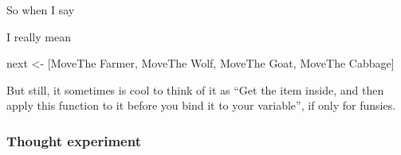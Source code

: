 \documentclass[]{article}
\newenvironment{Shaded}{}{}
\newcommand{\DataTypeTok}[1]{\textcolor[rgb]{0.56,0.13,0.00}{{#1}}}
\newcommand{\DecValTok}[1]{\textcolor[rgb]{0.25,0.63,0.44}{{#1}}}
\newcommand{\OtherTok}[1]{\textcolor[rgb]{0.00,0.44,0.13}{{#1}}}
\newcommand{\FunctionTok}[1]{\textcolor[rgb]{0.02,0.16,0.49}{{#1}}}
\newcommand{\NormalTok}[1]{{#1}}
\begin{document}
\begin{Shaded}
\end{Shaded}

So when I say

\begin{Shaded}
\end{Shaded}

I really mean

\begin{Shaded}
\begin{Highlighting}[]
\NormalTok{next }\OtherTok{<-} \NormalTok{[}\DataTypeTok{MoveThe} \DataTypeTok{Farmer}\NormalTok{, }\DataTypeTok{MoveThe} \DataTypeTok{Wolf}\NormalTok{, }\DataTypeTok{MoveThe} \DataTypeTok{Goat}\NormalTok{, }\DataTypeTok{MoveThe} \DataTypeTok{Cabbage}\NormalTok{]}
\end{Highlighting}
\end{Shaded}

But still, it sometimes is cool to think of it as ``Get the item inside, and
then apply this function to it before you bind it to your variable'', if only
for funsies.

\subsubsection{Thought experiment}\label{thought-experiment}
\end{document}
